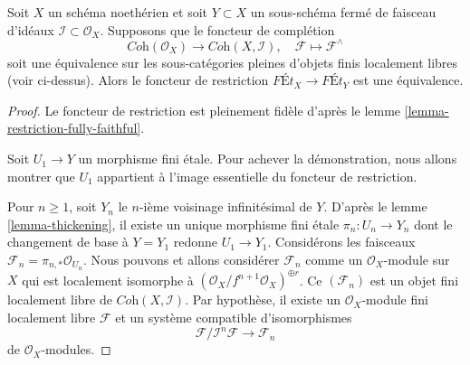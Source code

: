 \begin{lemma}
\label{lemma-restriction-equivalence}
Soit $X$ un schéma noethérien et soit $Y \subset X$ un sous-schéma fermé
de faisceau d'idéaux $\mathcal{I} \subset \mathcal{O}_X$.
Supposons que le foncteur de complétion
$$
\textit{Coh}(\mathcal{O}_X)
\longrightarrow 
\textit{Coh}(X, \mathcal{I}),\quad
\mathcal{F} \longmapsto \mathcal{F}^\wedge
$$
soit une équivalence sur les sous-catégories pleines d'objets finis
localement libres (voir ci-dessus).
Alors le foncteur de restriction $\textit{F\'Et}_X \to \textit{F\'Et}_Y$
est une équivalence.
\end{lemma}

\begin{proof}
Le foncteur de restriction est pleinement fidèle d'après le
lemme \ref{lemma-restriction-fully-faithful}.

\medskip\noindent
Soit $U_1 \to Y$ un morphisme fini étale. Pour achever la démonstration,
nous allons montrer que $U_1$ appartient à l'image essentielle du
foncteur de restriction.

\medskip\noindent
Pour $n \geq 1$, soit $Y_n$ le $n$-ième voisinage infinitésimal de $Y$.
D'après le lemme \ref{lemma-thickening},
il existe un unique morphisme fini étale
$\pi_n : U_n \to Y_n$ dont le changement de base à $Y = Y_1$
redonne $U_1 \to Y_1$.
Considérons les faisceaux $\mathcal{F}_n = \pi_{n, *}\mathcal{O}_{U_n}$.
Nous pouvons et allons considérer $\mathcal{F}_n$ comme un $\mathcal{O}_X$-module sur $X$
qui est localement isomorphe à
$(\mathcal{O}_X/f^{n + 1}\mathcal{O}_X)^{\oplus r}$.
Ce $(\mathcal{F}_n)$ est un objet fini localement libre de
$\textit{Coh}(X, \mathcal{I})$.
Par hypothèse, il existe un $\mathcal{O}_X$-module fini localement libre
$\mathcal{F}$ et un système compatible d'isomorphismes
$$
\mathcal{F}/\mathcal{I}^n\mathcal{F} \to \mathcal{F}_n
$$
de $\mathcal{O}_X$-modules.


\end{proof}

